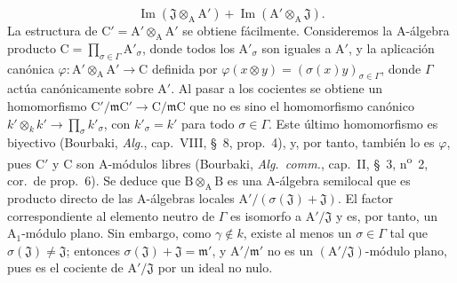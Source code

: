 \begin{env}[11.7.1]
\[{\operatorname{Im}(\mathfrak{J}\otimes_\mathrm{A}\mathrm{A}')+\operatorname{Im}(\mathrm{A}'\otimes_\mathrm{A}\mathfrak{J})}.
\]
La estructura de $\mathrm{C}'=\mathrm{A}'\otimes_\mathrm{A}\mathrm{A}'$ se obtiene fácilmente. Consideremos la $\mathrm{A}$-álgebra producto $\mathrm{C}=\prod_{\sigma\in\Gamma}\mathrm{A}'_\sigma$, donde todos los $\mathrm{A}'_\sigma$ son iguales a $\mathrm{A}'$, y la aplicación canónica $\varphi:\mathrm{A}'\otimes_\mathrm{A}\mathrm{A}'\to\mathrm{C}$ definida por $\varphi(x\otimes y)=(\sigma(x)y)_{\sigma\in\Gamma}$, donde $\Gamma$ actúa canónicamente sobre $\mathrm{A}'$. Al pasar a los cocientes se obtiene un homomorfismo $\mathrm{C}'/\mathfrak{m}\mathrm{C}'\to\mathrm{C}/\mathfrak{m}\mathrm{C}$ que no es sino el homomorfismo canónico $k'\otimes_k k'\to\prod_\sigma k'_\sigma$, con $k'_\sigma=k'$ para todo $\sigma\in\Gamma$. Este último homomorfismo es biyectivo (Bourbaki, \emph{Alg.}, cap.~VIII, \S~8, prop.~4), y, por tanto, también lo es $\varphi$, pues $\mathrm{C}'$ y $\mathrm{C}$ son $\mathrm{A}$-módulos libres (Bourbaki, \emph{Alg.\ comm.}, cap.~II, \S~3, n\textsuperscript{o}~2, cor.~de prop.~6).
Se deduce que $\mathrm{B}\otimes_\mathrm{A}\mathrm{B}$ es una $\mathrm{A}$-álgebra semilocal que es producto directo de las $\mathrm{A}$-álgebras locales $\mathrm{A}'/(\sigma(\mathfrak{J})+\mathfrak{J})$. El factor correspondiente al elemento neutro de $\Gamma$ es isomorfo a $\mathrm{A}'/\mathfrak{J}$ y es, por tanto, un $\mathrm{A}_1$-módulo plano. Sin embargo, como $\gamma\notin k$, existe al menos un $\sigma\in\Gamma$ tal que $\sigma(\mathfrak{J})\ne\mathfrak{J}$; entonces $\sigma(\mathfrak{J})+\mathfrak{J}=\mathfrak{m}'$, y $\mathrm{A}'/\mathfrak{m}'$ no es un $(\mathrm{A}'/\mathfrak{J})$-módulo plano, pues es el cociente de $\mathrm{A}'/\mathfrak{J}$ por un ideal no nulo.
\end{env}

